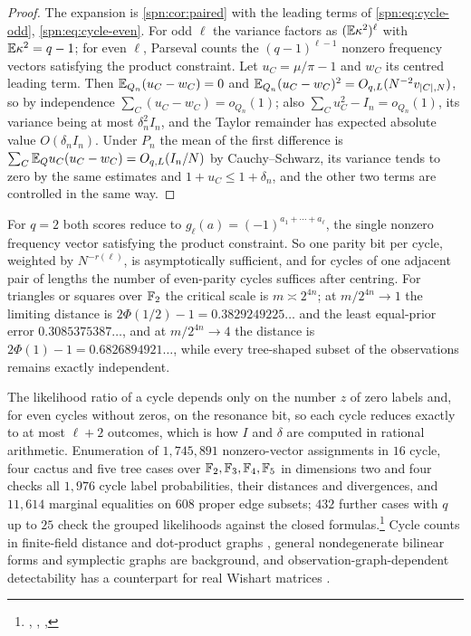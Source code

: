\begin{proof}
The expansion is \cref{spn:cor:paired} with the leading terms of \eqref{spn:eq:cycle-odd},
\eqref{spn:eq:cycle-even}. For odd $\ell$ the variance factors as $(\mathbb{E}\kappa^2)^\ell$ with
$\mathbb{E}\kappa^2=q-1$; for even $\ell$, Parseval counts the $(q-1)^{\ell-1}$ nonzero frequency vectors
satisfying the product constraint. Let $u_C=\mu/\pi-1$ and $w_C$ its centred leading term. Then
$\mathbb{E}_{Q_n}(u_C-w_C)=0$ and $\mathbb{E}_{Q_n}(u_C-w_C)^2=O_{q,L}(N^{-2}v_{\lvert C\rvert,N})$, so by independence
$\sum_C(u_C-w_C)=o_{Q_n}(1)$; also $\sum_Cu_C^2-I_n=o_{Q_n}(1)$, its variance being at most
$\delta_n^2I_n$, and the Taylor remainder has expected absolute value $O(\delta_nI_n)$. Under $P_n$
the mean of the first difference is $\sum_C\mathbb{E}_Qu_C(u_C-w_C)=O_{q,L}(I_n/N)$ by Cauchy--Schwarz, its
variance tends to zero by the same estimates and $1+u_C\le1+\delta_n$, and the other two terms are
controlled in the same way.
\end{proof}

\begin{remark}\label{spn:rem:binary-parity}
For $q=2$ both scores reduce to $g_\ell(a)=(-1)^{a_1+\cdots+a_\ell}$, the single nonzero frequency
vector satisfying the product constraint. So one parity bit per cycle, weighted by $N^{-r(\ell)}$,
is asymptotically sufficient, and for cycles of one adjacent pair of lengths the number of
even-parity cycles suffices after centring. For triangles or squares over $\mathbb{F}_2$ the critical scale
is $m\asymp2^{4n}$; at $m/2^{4n}\to1$ the limiting distance is $2\Phi(1/2)-1=0.3829249225\ldots$
and the least equal-prior error $0.3085375387\ldots$, and at $m/2^{4n}\to4$ the distance is
$2\Phi(1)-1=0.6826894921\ldots$, while every tree-shaped subset of the observations remains exactly
independent.
\end{remark}

The likelihood ratio of a cycle depends only on the number $z$ of zero labels and, for even
cycles without zeros, on the resonance bit, so each cycle reduces exactly to at most $\ell+2$
outcomes, which is how $I$ and $\delta$ are computed in rational arithmetic. Enumeration of
$1{,}745{,}891$ nonzero-vector assignments in $16$ cycle, four cactus and five tree cases over
$\mathbb{F}_2,\mathbb{F}_3,\mathbb{F}_4,\mathbb{F}_5$ in dimensions two and four checks all $1{,}976$ cycle label probabilities,
their distances and divergences, and $11{,}614$ marginal equalities on $608$ proper edge subsets;
$432$ further cases with $q$ up to $25$ check the grouped likelihoods against the closed
formulas.\footnote{\raggedright{},
,
,
}
Cycle counts in finite-field distance and dot-product graphs \cite{IosevichJardineMcDonald2021Cycles},
general nondegenerate bilinear forms \cite{Bright2023Generalized} and symplectic graphs
\cite{TangWan2006Symplectic} are background, and observation-graph-dependent detectability has a
counterpart for real Wishart matrices \cite{BrennanBreslerHuang2021Finetti}.

